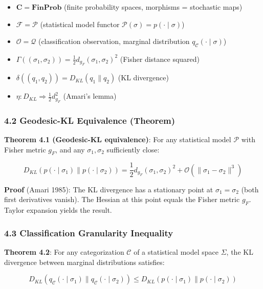 \documentclass[
]{article}
\providecommand{\tightlist}{%
  \setlength{\itemsep}{0pt}\setlength{\parskip}{0pt}}
\begin{document}
\begin{itemize}
\tightlist
\item
  \(\mathbf{C} = \mathbf{FinProb}\) (finite probability spaces,
  morphisms = stochastic maps)
\item
  \(\mathcal{F} = \mathcal{P}\) (statistical model functor
  \(\mathcal{P}(\sigma) = p(\cdot \mid \sigma)\))
\item
  \(\mathcal{O} = \mathcal{Q}\) (classification observation, marginal
  distribution \(q_{\mathcal{C}}(\cdot \mid \sigma)\))
\item
  \(\Gamma((\sigma_1, \sigma_2)) = \frac{1}{2} d_{g_F}(\sigma_1, \sigma_2)^2\)
  (Fisher distance squared)
\item
  \(\delta((q_1, q_2)) = D_{KL}(q_1 \parallel q_2)\) (KL divergence)
\item
  \(\eta: D_{KL} \Rightarrow \frac{1}{2} d_{g_F}^2\) (Amari's lemma)
\end{itemize}

\subsubsection{4.2 Geodesic-KL Equivalence
(Theorem)}\label{geodesic-kl-equivalence-theorem}

\textbf{Theorem 4.1 (Geodesic-KL equivalence)}: For any statistical
model \(\mathcal{P}\) with Fisher metric \(g_F\), and any
\(\sigma_1, \sigma_2\) sufficiently close:

\[D_{KL}(p(\cdot \mid \sigma_1) \parallel p(\cdot \mid \sigma_2)) = \frac{1}{2} d_{g_F}(\sigma_1, \sigma_2)^2 + \mathcal{O}(\|\sigma_1 - \sigma_2\|^3)\]

\textbf{Proof} (Amari 1985): The KL divergence has a stationary point at
\(\sigma_1 = \sigma_2\) (both first derivatives vanish). The Hessian at
this point equals the Fisher metric \(g_F\). Taylor expansion yields the
result.

\subsubsection{4.3 Classification Granularity
Inequality}\label{classification-granularity-inequality}

\textbf{Theorem 4.2}: For any categorization \(\mathcal{C}\) of a
statistical model space \(\Sigma\), the KL divergence between marginal
distributions satisfies:

\[D_{KL}(q_{\mathcal{C}}(\cdot \mid \sigma_1) \parallel q_{\mathcal{C}}(\cdot \mid \sigma_2)) \leq D_{KL}(p(\cdot \mid \sigma_1) \parallel p(\cdot \mid \sigma_2))\]
\end{document}
